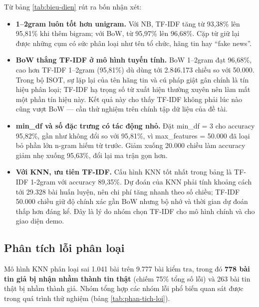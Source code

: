 Từ bảng \ref{tab:bieu-dien} rút ra bốn nhận xét:

\begin{itemize}
    \item \textbf{1--2gram luôn tốt hơn unigram.} Với NB, TF-IDF tăng từ 93,38\% lên 95,81\% khi thêm bigram; với BoW, từ 95,97\% lên 96,68\%. Cặp từ giữ lại được những cụm có sức phân loại như tên tổ chức, hãng tin hay ``fake news''.
    \item \textbf{BoW thắng TF-IDF ở mô hình tuyến tính.} BoW 1--2gram đạt 96,68\%, cao hơn TF-IDF 1--2gram (95,81\%) dù dùng tới 2.846.173 chiều so với 50.000. Trong bộ ISOT, sự lặp lại của tên hãng tin và cú pháp giật gân chính là tín hiệu phân loại; TF-IDF hạ trọng số từ xuất hiện thường xuyên nên làm mất một phần tín hiệu này. Kết quả này cho thấy TF-IDF không phải lúc nào cũng vượt BoW --- cần thử nghiệm trên chính tập dữ liệu của đề tài.
    \item \textbf{min\_df và số đặc trưng có tác động nhỏ.} Đặt min\_df = 3 cho accuracy 95,82\%, gần như không đổi so với 95,81\%, vì max\_features = 50.000 đã loại bỏ phần lớn n-gram hiếm từ trước. Giảm xuống 20.000 chiều làm accuracy giảm nhẹ xuống 95,63\%, đổi lại ma trận gọn hơn.
    \item \textbf{Với KNN, ưu tiên TF-IDF.} Cấu hình KNN tốt nhất trong bảng là TF-IDF 1-2gram với accuracy 89,35\%. Dự đoán của KNN phải tính khoảng cách tới 29.328 bài huấn luyện, nên chi phí tăng nhanh theo số chiều; TF-IDF 50.000 chiều giữ độ chính xác gần BoW nhưng bộ nhớ và thời gian dự đoán thấp hơn đáng kể. Đây là lý do nhóm chọn TF-IDF cho mô hình chính và cho giao diện demo.
\end{itemize}

\subsection{Phân tích lỗi phân loại}

Mô hình KNN phân loại sai 1.041 bài trên 9.777 bài kiểm tra, trong đó \textbf{778 bài tin giả bị nhận nhầm thành tin thật} (chiếm 75\% tổng số lỗi) và 263 bài tin thật bị nhầm thành giả. Nhóm tổng hợp các nhóm lỗi phổ biến quan sát được trong quá trình thử nghiệm (bảng \ref{tab:phan-tich-loi}).


